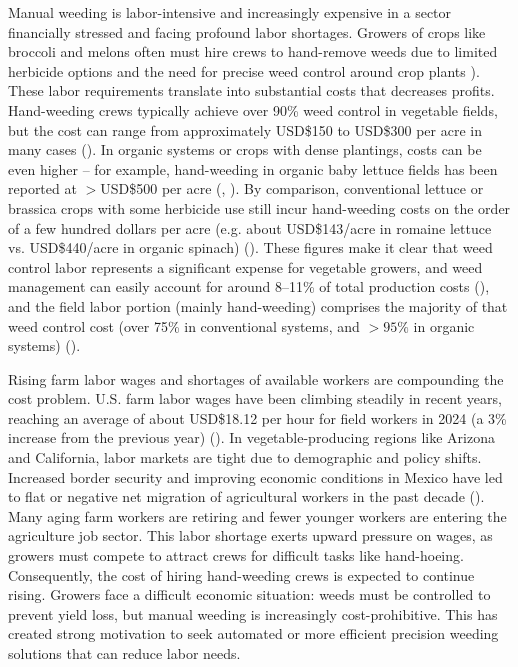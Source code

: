 \documentclass[letterpaper, notitlepage]{report}
\begin{document}
Manual weeding is labor-intensive and increasingly expensive in a sector financially stressed and facing profound labor shortages. Growers of crops like broccoli and melons often must hire crews to hand-remove weeds due to limited herbicide options and the need for precise weed control around crop plants \cite{American-Society-of-Agronomy2018-ad}). These labor requirements translate into substantial costs that decreases profits. Hand-weeding crews typically achieve over 90\% weed control in vegetable fields, but the cost can range from approximately USD\$150 to USD\$300 per acre in many cases (\cite{American-Society-of-Agronomy2018-ad}). In organic systems or crops with dense plantings, costs can be even higher – for example, hand-weeding in organic baby lettuce fields has been reported at $>$USD\$500 per acre (\cite{Fennimore2014-dc}, \cite{Kushal2024-jt}). By comparison, conventional lettuce or brassica crops with some herbicide use still incur hand-weeding costs on the order of a few hundred dollars per acre (e.g. about USD\$143/acre in romaine lettuce vs. USD\$440/acre in organic spinach) (\cite{Laura-Tourte2016-tf}). These figures make it clear that weed control labor represents a significant expense for vegetable growers, and weed management can easily account for around 8–11\% of total production costs (\cite{Laura-Tourte2016-tf}), and the field labor portion (mainly hand-weeding) comprises the majority of that weed control cost (over 75\% in conventional systems, and $>95\%$ in organic systems) (\cite{Laura-Tourte2016-tf}).

Rising farm labor wages and shortages of available workers are compounding the cost problem. U.S. farm labor wages have been climbing steadily in recent years, reaching an average of about USD\$18.12 per hour for field workers in 2024 (a 3\% increase from the previous year) (\cite{USDA2024-pq}). In vegetable-producing regions like Arizona and California, labor markets are tight due to demographic and policy shifts. Increased border security and improving economic conditions in Mexico have led to flat or negative net migration of agricultural workers in the past decade (\cite{Laura-Tourte2016-tf}). Many aging farm workers are retiring and fewer younger workers are entering the agriculture job sector. This labor shortage exerts upward pressure on wages, as growers must compete to attract crews for difficult tasks like hand-hoeing. Consequently, the cost of hiring hand-weeding crews is expected to continue rising. Growers face a difficult economic situation: weeds must be controlled to prevent yield loss, but manual weeding is increasingly cost-prohibitive. This has created strong motivation to seek automated or more efficient precision weeding solutions that can reduce labor needs.
\end{document}
